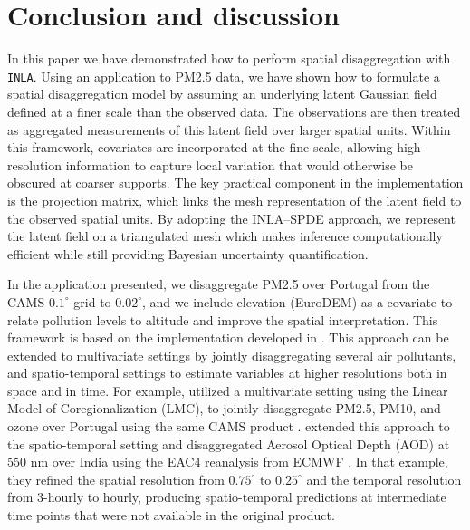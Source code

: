 \section{Conclusion and discussion}\label{sec:con}

In this paper we have demonstrated how to perform spatial disaggregation with \texttt{INLA}. Using an application to PM2.5 data, we have shown how to formulate a spatial disaggregation model by assuming an underlying latent Gaussian field defined at a finer scale than the observed data. The observations are then treated as aggregated measurements of this latent field over larger spatial units. Within this framework, covariates are incorporated at the fine scale, allowing high-resolution information to capture local variation that would otherwise be obscured at coarser supports. The key practical component in the implementation is the projection matrix, which links the mesh representation of the latent field to the observed spatial units. By adopting the INLA--SPDE approach, we represent the latent field on a triangulated mesh which makes inference computationally efficient while still providing Bayesian uncertainty quantification.

In the application presented, we disaggregate PM2.5 over Portugal from the CAMS \(0.1^\circ\) grid to \(0.02^\circ\), and we include elevation (EuroDEM) as a covariate to relate pollution levels to altitude and improve the spatial interpretation. This framework is based on the implementation developed in \citep{moraga2017geostatistical}. This approach can be extended to multivariate settings by jointly disaggregating several air pollutants, and spatio-temporal settings to estimate variables at higher resolutions both in space and in time. For example, \citep{RodriguezAvellanedaMult} utilized a multivariate setting using the Linear Model of Coregionalization (LMC), to jointly disaggregate PM2.5, PM10, and ozone over Portugal using the same CAMS product \citep{inness2019cams}.
\citep{avellaneda2025bayesianspatiotemporaldisaggregationmodeling} extended this approach to the spatio-temporal setting and disaggregated Aerosol Optical Depth (AOD) at 550 nm over India using the EAC4 reanalysis from ECMWF \citep{inness2019cams}. In that example, they refined the spatial resolution from \(0.75^\circ\) to \(0.25^\circ\) and the temporal resolution from 3-hourly to hourly, producing spatio-temporal predictions at intermediate time points that were not available in the original product.

